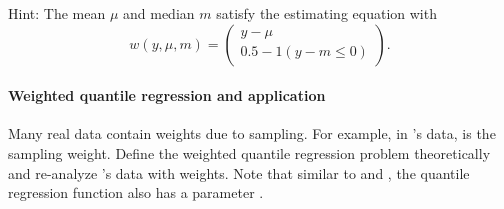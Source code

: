 Hint: The mean $\mu$ and median $m$ satisfy the estimating equation with 
$$
w(y, \mu, m) = \begin{pmatrix}
y - \mu \\
0.5 - 1(y - m \leq 0)
\end{pmatrix}. 
$$


\paragraph{Weighted quantile regression and application}\label{hw22::weighted-qr-application}

Many real data contain weights due to sampling. For example, in \citet{angrist2006quantile}'s data,  is the sampling weight. Define the weighted quantile regression problem theoretically and re-analyze \citet{angrist2006quantile}'s data with weights. Note that similar to  and , the quantile regression function   also has a parameter . 



 

